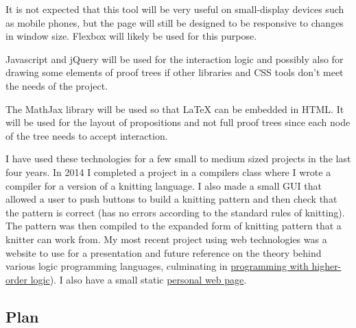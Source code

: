 \documentclass[12pt]{article}
\begin{document}
It is not expected that this tool will be very useful on small-display devices such as mobile phones, but the page will still be designed to be responsive to changes in window size. Flexbox will likely be used for this purpose.


Javascript and jQuery will be used for the interaction logic and possibly also for drawing some elements of proof trees if other libraries and CSS tools don't meet the needs of the project.

The MathJax library will be used so that \LaTeX{} can be embedded in HTML. It will be used for the layout of propositions and not full proof trees since each node of the tree needs to accept interaction.

I have used these technologies for a few small to medium sized projects in the last four years. In 2014 I completed a project in a compilers class where I wrote a compiler for a version of a knitting language. I also made a small GUI that allowed a user to push buttons to build a knitting pattern and then check that the pattern is correct (has no errors according to the standard rules of knitting). The pattern was then compiled to the expanded form of knitting pattern that a knitter can work from. My most recent project using web technologies was a website to use for a presentation and future reference on the theory behind various logic programming languages, culminating in \href{http://chelsea.lol/pwhol}{programming with higher-order logic}). I also have a small static \href{http://chelsea.lol}{personal web page}.


\subsection{Plan}


\end{document}
